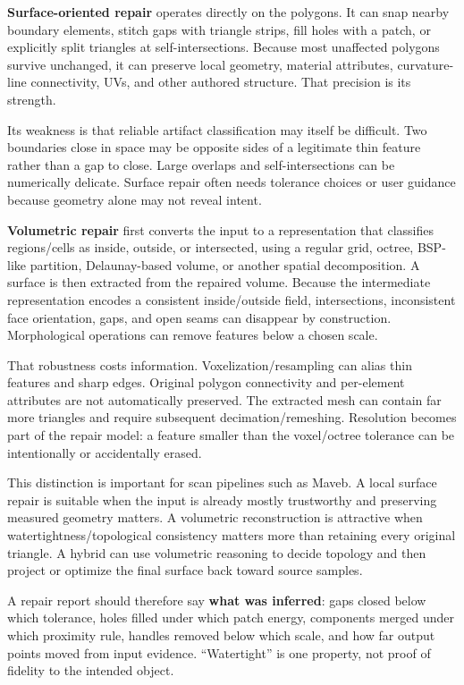 \textbf{Surface-oriented repair} operates directly on the polygons. It can snap nearby boundary elements, stitch gaps with triangle strips, fill holes with a patch, or explicitly split triangles at self-intersections. Because most unaffected polygons survive unchanged, it can preserve local geometry, material attributes, curvature-line connectivity, UVs, and other authored structure. That precision is its strength.

Its weakness is that reliable artifact classification may itself be difficult. Two boundaries close in space may be opposite sides of a legitimate thin feature rather than a gap to close. Large overlaps and self-intersections can be numerically delicate. Surface repair often needs tolerance choices or user guidance because geometry alone may not reveal intent.

\textbf{Volumetric repair} first converts the input to a representation that classifies regions/cells as inside, outside, or intersected, using a regular grid, octree, BSP-like partition, Delaunay-based volume, or another spatial decomposition. A surface is then extracted from the repaired volume. Because the intermediate representation encodes a consistent inside/outside field, intersections, inconsistent face orientation, gaps, and open seams can disappear by construction. Morphological operations can remove features below a chosen scale.

That robustness costs information. Voxelization/resampling can alias thin features and sharp edges. Original polygon connectivity and per-element attributes are not automatically preserved. The extracted mesh can contain far more triangles and require subsequent decimation/remeshing. Resolution becomes part of the repair model: a feature smaller than the voxel/octree tolerance can be intentionally or accidentally erased.

This distinction is important for scan pipelines such as Maveb. A local surface repair is suitable when the input is already mostly trustworthy and preserving measured geometry matters. A volumetric reconstruction is attractive when watertightness/topological consistency matters more than retaining every original triangle. A hybrid can use volumetric reasoning to decide topology and then project or optimize the final surface back toward source samples.

A repair report should therefore say \textbf{what was inferred}: gaps closed below which tolerance, holes filled under which patch energy, components merged under which proximity rule, handles removed below which scale, and how far output points moved from input evidence. ``Watertight'' is one property, not proof of fidelity to the intended object.

